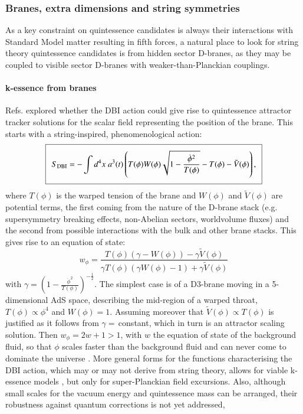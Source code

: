 \subsubsection{Branes, extra dimensions and string symmetries}
\label{S:DEbranes}

As a key constraint on quintessence candidates is always their interactions with Standard Model matter resulting in fifth forces, a natural place to look for string theory quintessence candidates is from hidden sector D-branes, as they may be coupled to visible sector D-branes with weaker-than-Planckian couplings.  

\paragraph{k-essence from branes}

Refs. \cite{Martin:2008xw, Gumjudpai:2009uy} explored whether the DBI action could give rise to quintessence attractor tracker solutions for the scalar field representing the position of the brane. This starts with a string-inspired, phenomenological action:
\begin{equation}
\setlength\fboxsep{0.25cm}
\setlength\fboxrule{0.4pt}
\boxed{
S_{\rm DBI}= -\int d^4x \; a^3(t) \left(T(\phi)W(\phi)\sqrt{1-\frac{\dot{\phi}^2}{T(\phi)}}-T(\phi)-\tilde{V}(\phi)\right), \label{E:DBIessence}
}
\end{equation}
where $T(\phi)$ is the warped tension of the brane and $W(\phi)$ and $\tilde{V}(\phi)$ are potential terms, the first coming from the nature of the D-brane stack (e.g. supersymmetry breaking effects, non-Abelian sectors, worldvolume fluxes) and the second from possible interactions with the bulk and other brane stacks.  This gives rise to an equation of state:
\begin{equation}
w_\phi = \frac{T(\phi)(\gamma-W(\phi))-\gamma \tilde{V}(\phi)}{\gamma T(\phi)(\gamma W(\phi)-1)+\gamma\tilde{V}(\phi)}
\end{equation}
with $\gamma = \left( 1-\frac{\dot{\phi}^2}{T(\phi)}\right)^{-\frac12}$. The simplest case is of a D3-brane moving in a 5-dimensional AdS space, describing the mid-region of a warped throat, $T(\phi) \propto \phi^4$ and $W(\phi)=1$. Assuming moreover that $\tilde{V}(\phi) \propto T(\phi)$ is justified as it follows from $\gamma=\,$constant, which in turn is an attractor scaling solution. Then $w_\phi=2w+1>1$, with $w$ the equation of state of the background fluid, so that $\phi$ scales faster than the background fluid and can never come to dominate the universe \cite{Martin:2008xw}.  More general forms for the functions characterising the DBI action, which may or may not derive from string theory, allows for viable k-essence models \cite{Gumjudpai:2009uy}, but only for super-Planckian field excursions.  Also, although  small scales for the vacuum energy and quintessence mass can be arranged, their robustness against quantum corrections is not yet addressed, 

